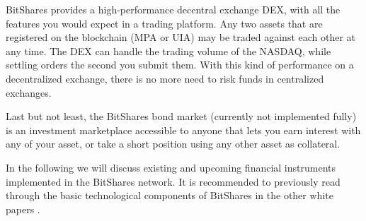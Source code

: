 BitShares provides a high-performance decentral exchange DEX, with all the
features you would expect in a trading platform. Any two assets that are
registered on the blockchain (MPA or UIA) may be traded against each other at
any time. The DEX can handle the trading volume of the NASDAQ, while settling
orders the second you submit them. With this kind of performance on a
decentralized exchange, there is no more need to risk funds in centralized
exchanges.

Last but not least, the BitShares bond market (currently not implemented fully)
is an investment marketplace accessible to anyone that lets you earn interest
with any of your asset, or take a short position using any other asset as
collateral.

In the following we will discuss existing and upcoming financial instruments
implemented in the BitShares network. It is recommended to previously read
through the basic technological components of BitShares in the other white
papers \cite{}.
